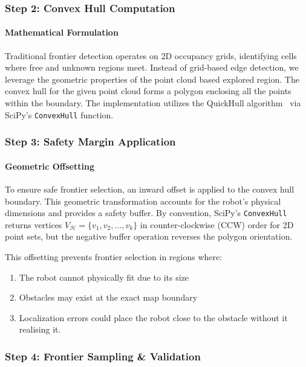 \documentclass[11pt]{article}
\begin{document}
\subsubsection{Step 2: Convex Hull Computation}

\paragraph{Mathematical Formulation}

Traditional frontier detection operates on 2D occupancy grids, identifying cells where free and unknown regions meet. Instead of grid-based edge detection, we leverage the geometric properties of the point cloud based explored region. The convex hull for the given point cloud forms a polygon enclosing all the points within the boundary. The implementation utilizes the QuickHull algorithm~\cite{barber1996quickhull} via SciPy's \texttt{ConvexHull} function.

\subsubsection{Step 3: Safety Margin Application}

\paragraph{Geometric Offsetting}

To ensure safe frontier selection, an inward offset is applied to the convex hull boundary. This geometric transformation accounts for the robot's physical dimensions and provides a safety buffer.
By convention, SciPy's \texttt{ConvexHull} returns vertices $V_{\mathcal{H}} = \{v_1, v_2, \ldots, v_k\}$ in counter-clockwise (CCW) order for 2D point sets, but the negative buffer operation reverses the polygon orientation.

This offsetting prevents frontier selection in regions where:
\begin{enumerate}[noitemsep]
	\item The robot cannot physically fit due to its size
	\item Obstacles may exist at the exact map boundary
	\item Localization errors could place the robot close to the obstacle without it realising it.
\end{enumerate}

\subsubsection{Step 4: Frontier Sampling \& Validation}
\end{document}

